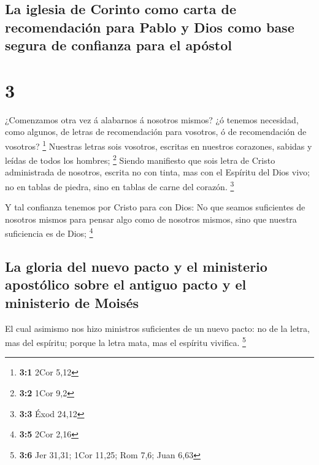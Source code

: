 \hypertarget{la-iglesia-de-corinto-como-carta-de-recomendaciuxf3n-para-pablo-y-dios-como-base-segura-de-confianza-para-el-apuxf3stol}{%
\subsection{La iglesia de Corinto como carta de recomendación para Pablo
y Dios como base segura de confianza para el
apóstol}\label{la-iglesia-de-corinto-como-carta-de-recomendaciuxf3n-para-pablo-y-dios-como-base-segura-de-confianza-para-el-apuxf3stol}}

\hypertarget{section-2}{%
\section{3}\label{section-2}}

 ¿Comenzamos otra vez á alabarnos á nosotros mismos? ¿ó
tenemos necesidad, como algunos, de letras de recomendación para
vosotros, ó de recomendación de vosotros? \footnote{\textbf{3:1} 2Cor
  5,12}  Nuestras letras sois vosotros, escritas en nuestros
corazones, sabidas y leídas de todos los hombres; \footnote{\textbf{3:2}
  1Cor 9,2}  Siendo manifiesto que sois letra de Cristo
administrada de nosotros, escrita no con tinta, mas con el Espíritu del
Dios vivo; no en tablas de piedra, sino en tablas de carne del corazón.
\footnote{\textbf{3:3} Éxod 24,12}

 Y tal confianza tenemos por Cristo para con Dios:
 No que seamos suficientes de nosotros mismos para pensar
algo como de nosotros mismos, sino que nuestra suficiencia es de Dios;
\footnote{\textbf{3:5} 2Cor 2,16}

\hypertarget{la-gloria-del-nuevo-pacto-y-el-ministerio-apostuxf3lico-sobre-el-antiguo-pacto-y-el-ministerio-de-moisuxe9s}{%
\subsection{La gloria del nuevo pacto y el ministerio apostólico sobre
el antiguo pacto y el ministerio de
Moisés}\label{la-gloria-del-nuevo-pacto-y-el-ministerio-apostuxf3lico-sobre-el-antiguo-pacto-y-el-ministerio-de-moisuxe9s}}

 El cual asimismo nos hizo ministros suficientes de un nuevo
pacto: no de la letra, mas del espíritu; porque la letra mata, mas el
espíritu vivifica. \footnote{\textbf{3:6} Jer 31,31; 1Cor 11,25; Rom
  7,6; Juan 6,63}

